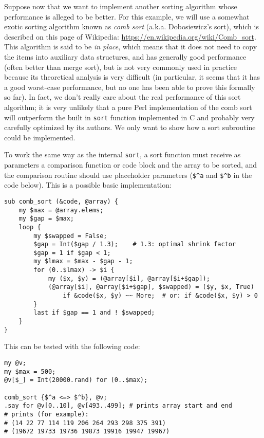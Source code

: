 Suppose now that we want to implement another sorting 
algorithm whose performance is alleged to be better. 
For this example, we will use a somewhat exotic sorting 
algorithm known as \emph{comb sort} (a.k.a. Dobosiewicz's 
sort), which is described on this page of Wikipedia:
\url{https://en.wikipedia.org/wiki/Comb_sort}. This 
algorithm is said to be \emph{in place}, which means that 
it does not need to copy the items into auxiliary data 
structures, and has generally good performance (often better 
than merge sort), but is not very commonly used in 
practice because its theoretical analysis is very difficult 
(in particular, it seems that it has a good worst-case 
performance, but no one has been able to prove this 
formally so far). In fact, we don't really care about 
the real performance of this sort algorithm; it is 
very unlikely that a pure Perl implementation 
of the comb sort will outperform the built in 
{\tt sort} function implemented in C and probably very 
carefully optimized by its authors. We only want to 
show how a sort subroutine could be implemented.

To work the same way as the internal {\tt sort}, a sort 
function must receive as parameters a comparison function 
or code block and the array to be sorted, and the 
comparison routine should use placeholder parameters (\verb'$^a' 
and  \verb'$^b' in the code below). This is a possible 
basic implementation:

\begin{verbatim}
sub comb_sort (&code, @array) {
    my $max = @array.elems;
    my $gap = $max;
    loop {
        my $swapped = False;
        $gap = Int($gap / 1.3);    # 1.3: optimal shrink factor
        $gap = 1 if $gap < 1;
        my $lmax = $max - $gap - 1;
        for (0..$lmax) -> $i {
            my ($x, $y) = (@array[$i], @array[$i+$gap]);
            (@array[$i], @array[$i+$gap], $swapped) = ($y, $x, True)
                if &code($x, $y) ~~ More;  # or: if &code($x, $y) > 0
        }
        last if $gap == 1 and ! $swapped;
    }
}
\end{verbatim}

This can be tested with the following code:

\begin{verbatim}
my @v;
my $max = 500;
@v[$_] = Int(20000.rand) for (0..$max);

comb_sort {$^a <=> $^b}, @v;
.say for @v[0..10], @v[493..499]; # prints array start and end
# prints (for example):
# (14 22 77 114 119 206 264 293 298 375 391)
# (19672 19733 19736 19873 19916 19947 19967)
\end{verbatim}

